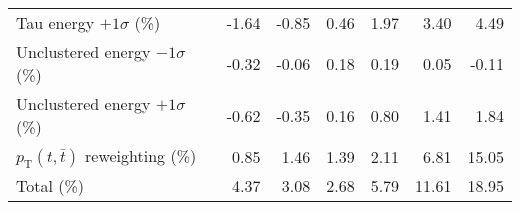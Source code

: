 \begin{table}[htbp]
{\begin{tabular}{lrrrrrr}
Tau energy $+1\sigma$ (\%) & -1.64 & -0.85 & 0.46 & 1.97 & 3.40 & 4.49 \\ 
Unclustered energy $-1\sigma$ (\%) & -0.32 & -0.06 & 0.18 & 0.19 & 0.05 & -0.11 \\ 
Unclustered energy $+1\sigma$ (\%) & -0.62 & -0.35 & 0.16 & 0.80 & 1.41 & 1.84 \\ 
$p_\mathrm{T}(t,\bar{t})$ reweighting (\%) & 0.85 & 1.46 & 1.39 & 2.11 & 6.81 & 15.05 \\ 
\hline 
Total (\%) & 4.37  & 3.08  & 2.68  & 5.79  & 11.61  & 18.95 \\ 
\hline 
\end{tabular}
}
\end{table}
